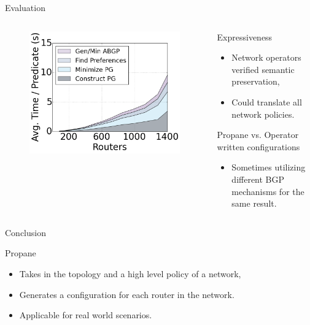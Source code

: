 \begin{frame}{Evaluation}
    \begin{columns}
        \begin{column}{0.45\textwidth}
            \begin{figure}
                \includegraphics[width=0.66\columnwidth,keepaspectratio]{figures/compilation-times-dc}
            \end{figure}
        \end{column}
        \begin{column}{0.50\textwidth}
            \begin{block}{Expressiveness}
                \begin{itemize}
                    \item Network operators verified semantic preservation,
                    \item Could translate all network policies.
                \end{itemize}
            \end{block}
            \begin{block}{Propane vs. Operator written configurations}
                \begin{itemize}
                    \item Sometimes utilizing different BGP mechanisms for the same result.
                \end{itemize}
            \end{block}
        \end{column}
    \end{columns}
\end{frame}

\begin{frame}{Conclusion}
    \begin{block}{Propane}
        \begin{itemize}
            \item Takes in the topology and a high level policy of a network,
            \item Generates a configuration for each router in the network.
            \item Applicable for real world scenarios.
        \end{itemize}
    \end{block}
\end{frame}
